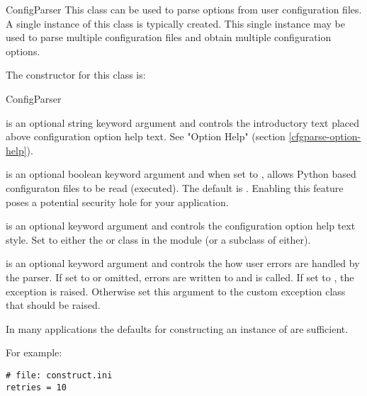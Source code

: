 \documentclass{howto}
\begin{document}
\begin{classdesc*}{ConfigParser}
  This class can be used to parse options from user configuration files.  
  A single instance of this class is typically created.  This single instance
  may be used to parse multiple configuration files and obtain multiple
  configuration options.
  
  The constructor for this class is:

  \begin{funcdesc}{ConfigParser}{}

     is an optional string keyword argument and controls
        the introductory text placed above configuration option help text.
        See "Option Help" (section \ref{cfgparse-option-help}).
        
     is an optional boolean keyword argument and when set to
        , allows Python based configuraton files to be read
        (executed).  The default is .  Enabling this feature
        poses a potential security hole for your application.
    
     is an optional keyword argument and controls 
        the configuration option help text style.  Set to either the 
         or  class
        in the  module (or a subclass of either).
    
     is an optional keyword argument and controls 
        the how user errors are handled by the parser.  If set to 
         or omitted, errors are written to  and
         is called.  If set to , the
         exception is raised.  Otherwise set
        this argument to the custom exception class that should be raised.
  \end{funcdesc}

\end{classdesc*}

In many applications the defaults for constructing an instance of 
 are sufficient.

For example:

\begin{verbatim}
# file: construct.ini
retries = 10
\end{verbatim}
\end{document}

